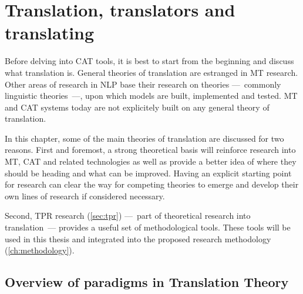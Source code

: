 
\chapter{Translation, translators and translating} %
\label{ch:translation} %


\noindent Before delving into \ac{CAT} tools, it is best to start from the beginning and discuss what translation is. General theories of translation are estranged in \ac{MT} research. Other areas of research in \ac{NLP} base their research on theories ---~commonly linguistic theories~---, upon which models are built, implemented and tested. \ac{MT} and \ac{CAT} systems today are not explicitely built on any general theory of translation.

In this chapter, some of the main theories of translation are discussed for two reasons. First and foremost, a strong theoretical basis will reinforce research into \ac{MT}, \ac{CAT} and related technologies as well as provide a better idea of where they should be heading and what can be improved. Having an explicit starting point for research can clear the way for competing theories to emerge and develop their own lines of research if considered necessary. 

Second, \acf{TPR} research (\autoref{sec:tpr}) ---~part of theoretical research into translation~--- provides a useful set of methodological tools. These tools will be used in this thesis and integrated into the proposed research methodology (\autoref{ch:methodology}).



\section{Overview of paradigms in Translation Theory}
\label{sec:paradigms}

